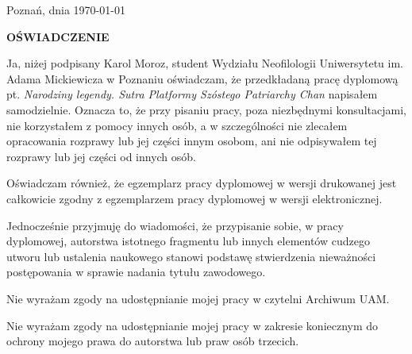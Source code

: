 \newpage
\pagestyle{empty}
\vspace*{10em}
\begin{flushright}
Poznań, dnia \today
\end{flushright}
\begin{center}
  \bfseries\large OŚWIADCZENIE
\end{center}

Ja, niżej podpisany Karol Moroz, student Wydziału Neofilologii Uniwersytetu im. Adama Mickiewicza w Poznaniu oświadczam, że przedkładaną pracę dyplomową pt. \nohyphens{\itshape Narodziny legendy. Sutra Platformy Szóstego Patriarchy Chan} napisałem samodzielnie. Oznacza to, że przy pisaniu pracy, poza niezbędnymi konsultacjami, nie korzystałem z pomocy innych osób, a w szczególności nie zlecałem opracowania rozprawy lub jej części innym osobom, ani nie odpisywałem tej rozprawy lub jej części od innych osób.

Oświadczam również, że egzemplarz pracy dyplomowej w wersji drukowanej jest całkowicie zgodny z egzemplarzem pracy dyplomowej w wersji elektronicznej.

Jednocześnie przyjmuję do wiadomości, że przypisanie sobie, w pracy dyplomowej, autorstwa istotnego fragmentu lub innych elementów cudzego utworu lub ustalenia naukowego stanowi podstawę stwierdzenia nieważności postępowania w sprawie nadania tytułu zawodowego.

Nie wyrażam zgody na udostępnianie mojej pracy w czytelni Archiwum UAM.

Nie wyrażam zgody na udostępnianie mojej pracy w zakresie koniecznym do ochrony mojego prawa do autorstwa lub praw osób trzecich.

\vspace*{\fill}
